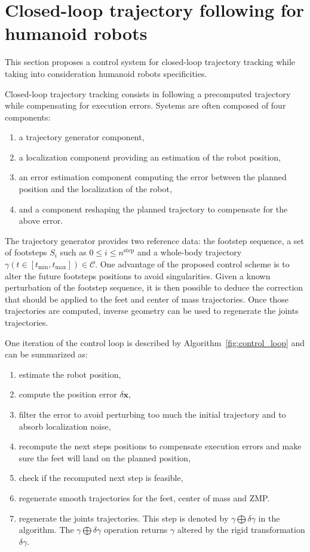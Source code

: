 \section{Closed-loop trajectory following for humanoid robots}
\label{closedloop}


This section proposes a control system for closed-loop trajectory
tracking while taking into consideration humanoid robots
specificities.


Closed-loop trajectory tracking consists in following a precomputed
trajectory while compensating for execution errors. Systems are often
composed of four components:
\begin{enumerate}
\item a trajectory generator component,
\item a localization component providing an estimation of the robot
  position,
\item an error estimation component computing the error between the
  planned position and the localization of the robot,
\item and a component reshaping the planned trajectory to compensate
  for the above error.
\end{enumerate}


The trajectory generator provides two reference data: the footstep
sequence, a set of footsteps $S_i$ such as \mbox{$0 \leq i \leq
  n^{\text{step}}$} and a whole-body trajectory \mbox{$\gamma(t \in
  [t_{\text{min}}, t_{\text{max}}]) \in \mathcal{C}$}. One advantage
of the proposed control scheme is to alter the future footsteps
positions to avoid singularities. Given a known perturbation of the
footstep sequence, it is then possible to deduce the correction that
should be applied to the feet and center of mass trajectories. Once
those trajectories are computed, inverse geometry can be used to
regenerate the joints trajectories.


One iteration of the control loop is described by
Algorithm~\ref{fig:control_loop} and can be summarized as:
\begin{enumerate}
\item estimate the robot position,
\item compute the position error \mbox{$\delta \mathbf{x}$},
\item filter the error to avoid perturbing too much the initial
  trajectory and to absorb localization noise,
\item recompute the next steps positions to compensate execution
  errors and make sure the feet will land on the planned position,
\item check if the recomputed next step is feasible,
\item regenerate smooth trajectories for the feet, center of mass and
  ZMP.
\item regenerate the joints trajectories. This step is denoted by
  \mbox{$\gamma \bigoplus \delta \gamma$} in the algorithm. The
  \mbox{$\gamma \bigoplus \delta \gamma$} operation returns $\gamma$
  altered by the rigid transformation \mbox{$\delta \gamma$}.
\end{enumerate}


